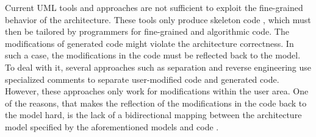 

Current UML tools and approaches are not sufficient to exploit the fine-grained behavior of the architecture. 
These tools only produce skeleton code \cite{zheng2013classification}, which must then be tailored by programmers for fine-grained and algorithmic code. 
The modifications of generated code might violate the architecture correctness.
In such a case, the modifications in the code must be reflected back to the model. 
To deal with it, several approaches such as separation \cite{steinberg2008emf} and reverse engineering \cite{ibm_rhapsody} use specialized comments to separate user-modified code and generated code.
However, these approaches only work for modifications within the user area.
One of the reasons, that makes the reflection of the modifications in the code back to the model hard, is the lack of a bidirectional mapping between the architecture model specified by the aforementioned models and code \cite{ubayashi2010archface}.

